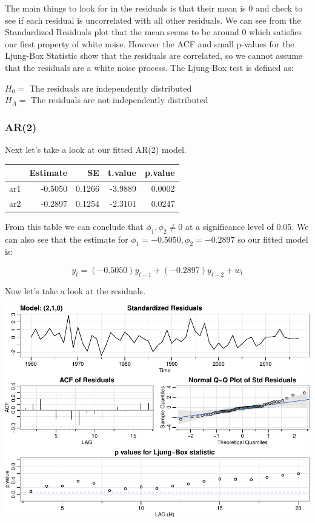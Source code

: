\documentclass[
]{article}
\begin{document}
The main things to look for in the residuals is that their mean is 0 and
check to see if each residual is uncorrelated with all other residuals.
We can see from the Standardized Residuals plot that the mean seems to
be around 0 which satisfies our first property of white noise. However
the ACF and small p-values for the Ljung-Box Statistic show that the
residuals are correlated, so we cannot assume that the residuals are a
white noise process. The Ljung-Box test is defined as:

\begin{center}

$H_0 =$ The residuals are independently distributed \\
$H_A =$ The residuals are not independently distributed

\end{center}

\hypertarget{ar2}{%
\subsubsection{AR(2)}\label{ar2}}

Next let's take a look at our fitted AR(2) model.

\begin{center}

\begin{tabular}{l|r|r|r|r}
\hline
  & Estimate & SE & t.value & p.value\\
\hline
ar1 & -0.5050 & 0.1266 & -3.9889 & 0.0002\\
\hline
ar2 & -0.2897 & 0.1254 & -2.3101 & 0.0247\\
\hline
\end{tabular}
\end{center}

From this table we can conclude that \(\phi_1,\phi_2 \neq 0\) at a
significance level of 0.05. We can also see that the estimate for
\(\phi_1 = -0.5050, \phi_2 = -0.2897\) so our fitted model is:

\[y_t = (-0.5050) y_{t-1} + (-0.2897) y_{t-2} + w_t\]

Now let's take a look at the residuals.

\includegraphics{STA_137_Final_Project_files/figure-latex/unnamed-chunk-10-1.pdf}
\end{document}
